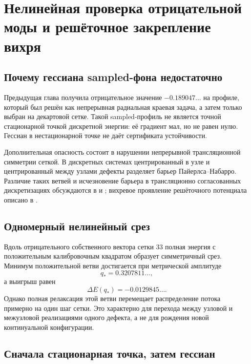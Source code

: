 \chapter{Нелинейная проверка отрицательной моды и решёточное закрепление вихря}

\section{Почему гессиана sampled-фона недостаточно}

Предыдущая глава получила отрицательное значение $-0.189047\ldots$ на
профиле, который был решён как непрерывная радиальная краевая задача, а
затем только выбран на декартовой сетке. Такой sampled-профиль не является
точной стационарной точкой дискретной энергии: её градиент мал, но не
равен нулю. Гессиан в нестационарной точке не даёт сертификата
устойчивости.

Дополнительная опасность состоит в нарушении непрерывной трансляционной
симметрии сеткой. В дискретных системах центрированный в узле и
центрированный между узлами дефекты разделяет барьер Пайерлса--Набарро.
Различие таких ветвей и исчезновение барьера в трансляционно согласованных
дискретизациях обсуждаются в  и
; вихревое проявление решёточного потенциала
описано в .

\section{Одномерный нелинейный срез}

Вдоль отрицательного собственного вектора сетки $33$ полная энергия с
положительным калибровочным квадратом образует симметричный срез. Минимум
положительной ветви достигается при метрической амплитуде
\begin{equation}
 q_*=0.3207811\ldots,
\end{equation}
а выигрыш равен
\begin{equation}
 \Delta E(q_*)=-0.0129845\ldots.
\end{equation}
Однако полная релаксация этой ветви перемещает распределение потока
примерно на один шаг сетки. Это характерно для перехода между
узловой и межузловой реализациями одного дефекта, а не для рождения новой
континуальной конфигурации.

\section{Сначала стационарная точка, затем гессиан}

